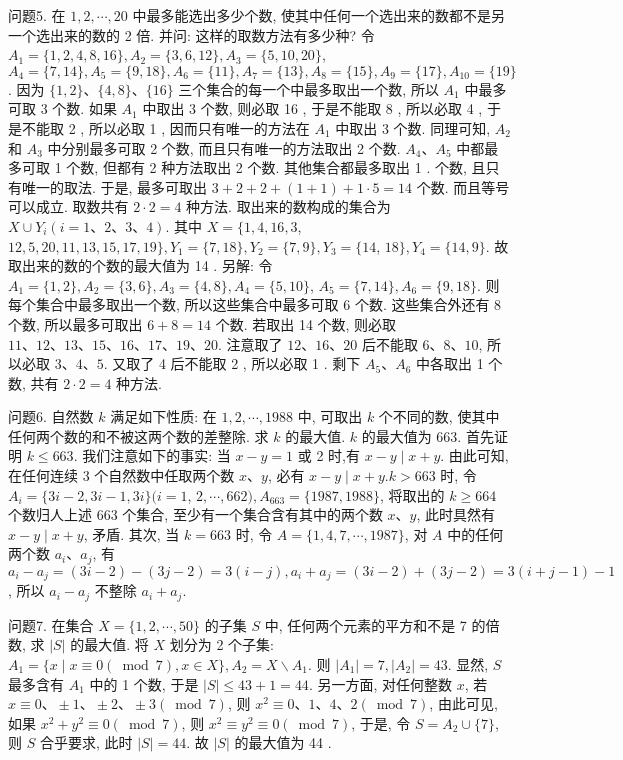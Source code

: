 问题5. 在 $1,2, \cdots, 20$ 中最多能选出多少个数, 使其中任何一个选出来的数都不是另一个选出来的数的 2 倍.
并问: 这样的取数方法有多少种?
令 $A_1=\{1,2,4,8,16\}, A_2=\{3,6,12\}, A_3=\{5,10,20\}$, $A_4=\{7,14\}, A_5=\{9,18\}, A_6=\{11\}, A_7=\{13\}, A_8=\{15\}, A_9=\{17\}, A_{10}=\{19\}$. 因为 $\{1,2\} 、\{4,8\} 、\{16\}$ 三个集合的每一个中最多取出一个数, 所以 $A_1$ 中最多可取 3 个数.
如果 $A_1$ 中取出 3 个数, 则必取 16 , 于是不能取 8 , 所以必取 4 , 于是不能取 2 , 所以必取 1 , 因而只有唯一的方法在 $A_1$ 中取出 3 个数.
同理可知, $A_2$ 和 $A_3$ 中分别最多可取 2 个数, 而且只有唯一的方法取出 2 个数.
$A_4 、 A_5$ 中都最多可取 1 个数, 但都有 2 种方法取出 2 个数.
其他集合都最多取出 1 . 个数, 且只有唯一的取法.
于是, 最多可取出 $3+2+ 2+(1+1)+1 \cdot 5=14$ 个数.
而且等号可以成立.
取数共有 $2 \cdot 2=4$ 种方法.
取出来的数构成的集合为 $X \cup Y_i(i=1 、 2 、 3 、 4)$. 其中 $X=\{1,4,16,3$, $12,5,20,11,13,15,17,19\}, Y_1=\{7,18\}, Y_2=\{7,9\}, Y_3=\{14$, $18\}, Y_4=\{14,9\}$. 故取出来的数的个数的最大值为 14 .
另解: 令 $A_1=\{1,2\}, A_2=\{3,6\}, A_3=\{4,8\}, A_4=\{5,10\}$, $A_5=\{7,14\}, A_6=\{9,18\}$. 则每个集合中最多取出一个数, 所以这些集合中最多可取 6 个数.
这些集合外还有 8 个数, 所以最多可取出 $6+8=14$ 个数.
若取出 14 个数, 则必取 $11 、 12 、 13 、 15 、 16 、 17 、 19 、 20$. 注意取了 $12 、 16 、 20$ 后不能取 $6 、 8 、 10$, 所以必取 $3 、 4 、 5$. 又取了 4 后不能取 2 , 所以必取 1 . 剩下 $A_5 、 A_6$ 中各取出 1 个数, 共有 $2 \cdot 2=4$ 种方法.



问题6. 自然数 $k$ 满足如下性质: 在 $1,2, \cdots, 1988$ 中, 可取出 $k$ 个不同的数, 使其中任何两个数的和不被这两个数的差整除.
求 $k$ 的最大值.
$k$ 的最大值为 663. 首先证明 $k \leqslant 663$. 我们注意如下的事实: 当 $x- y=1$ 或 2 时,有 $x-y \mid x+y$. 由此可知,在任何连续 3 个自然数中任取两个数 $x 、 y$, 必有 $x-y \mid x+y . k>663$ 时, 令 $A_i=\{3 i-2,3 i-1,3 i\}(i=1$, $2, \cdots, 662), A_{663}=\{1987,1988\}$, 将取出的 $k \geqslant 664$ 个数归人上述 663 个集合, 至少有一个集合含有其中的两个数 $x 、 y$, 此时具然有 $x-y \mid x+y$, 矛盾.
其次, 当 $k=663$ 时, 令 $A=\{1,4,7, \cdots, 1987\}$, 对 $A$ 中的任何两个数 $a_i 、 a_j$, 有 $a_i-a_j=(3 i-2)-(3 j-2)=3(i-j), a_i+a_j=(3 i-2)+(3 j-2)= 3(i+j-1)-1$, 所以 $a_i-a_j$ 不整除 $a_i+a_j$.



问题7. 在集合 $X=\{1,2, \cdots, 50\}$ 的子集 $S$ 中, 任何两个元素的平方和不是 7 的倍数, 求 $|S|$ 的最大值.
将 $X$ 划分为 2 个子集: $A_1=\{x \mid x \equiv 0(\bmod 7), x \in X\}, A_2= X \backslash A_1$. 则 $\left|A_1\right|=7,\left|A_2\right|=43$. 显然, $S$ 最多含有 $A_1$ 中的 1 个数, 于是 $|S| \leqslant 43+1=44$. 另一方面, 对任何整数 $x$, 若 $x \equiv 0 、 \pm 1 、 \pm 2 、 \pm 3(\bmod 7)$, 则 $x^2 \equiv 0 、 1 、 4 、 2(\bmod 7)$, 由此可见, 如果 $x^2+y^2 \equiv 0(\bmod 7)$, 则 $x^2 \equiv y^2 \equiv 0(\bmod 7)$, 于是, 令 $S=A_2 \cup\{7\}$, 则 $S$ 合乎要求, 此时 $|S|=44$. 故 $|S|$ 的最大值为 44 .



